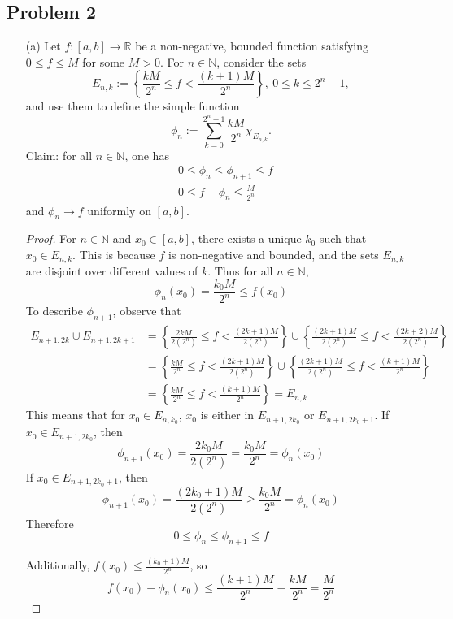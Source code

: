 \documentclass[12pt]{article}
\begin{document}
\subsection*{Problem 2}

\begin{itemize}
    \item[(a)] Let $f: [a,b] \to \mathbb{R}$ be a non-negative, bounded function satisfying $0 \leq f \leq M$ for some $M > 0$. For $n \in \mathbb{N}$, consider the sets $$E_{n,k} := \left\{ \frac{kM}{2^n} \leq f < \frac{(k+1)M}{2^n}\right\},~ 0 \leq k \leq 2^n -1,$$ and use them to define the simple function $$\phi_n := \sum_{k=0}^{2^n-1} \frac{kM}{2^n} \chi_{E_{n,k}}.$$ Claim: for all $n \in \mathbb{N}$, one has 
    \begin{align*}
        & 0 \leq \phi_n \leq \phi_{n+1} \leq f \\
        & 0 \leq f - \phi_n \leq \frac{M}{2^n}
    \end{align*}
    and $\phi_n \to f$ uniformly on $[a,b]$.

    \begin{proof}
        For $n \in \mathbb{N}$ and $x_0 \in [a,b]$, there exists a unique $k_0$ such that $x_0 \in E_{n,k}$. This is because $f$ is non-negative and bounded, and the sets $E_{n,k}$ are disjoint over different values of $k$. Thus for all $n \in \mathbb{N}$, $$\phi_n (x_0) = \frac{k_0M}{2^n} \leq f(x_0)$$ To describe $\phi_{n+1}$, observe that
        \begin{align*}
            E_{n+1, 2k} \cup E_{n+1, 2k+1} &= \left\{ \frac{2kM}{2 (2^n)} \leq f < \frac{(2k+1)M}{2(2^n)}\right\} \cup \left\{ \frac{(2k+1)M}{2(2^n)} \leq f < \frac{(2k+2)M}{2(2^n)}\right\} \\
            &= \left\{ \frac{kM}{2^n} \leq f < \frac{(2k+1)M}{2(2^n)}\right\} \cup \left\{ \frac{(2k+1)M}{2(2^n)} \leq f < \frac{(k+1)M}{2^n}\right\} \\
            &= \left\{ \frac{kM}{2^n} \leq f < \frac{(k+1)M}{2^n}\right\} = E_{n,k}
        \end{align*}
        This means that for $x_0 \in E_{n,k_0}$, $x_0$ is either in $E_{n+1, 2k_0}$ or $E_{n+1, 2k_0+1}$. If $x_0 \in E_{n+1, 2k_0}$, then $$\phi_{n+1}(x_0) = \frac{2k_0M}{2(2^n)} = \frac{k_0M}{2^n} = \phi_n(x_0)$$ If $x_0 \in E_{n+1, 2k_0+1}$, then $$\phi_{n+1}(x_0) = \frac{(2k_0+1)M}{2(2^n)} \geq \frac{k_0M}{2^n} = \phi_n(x_0)$$ Therefore $$0 \leq \phi_n \leq \phi_{n+1} \leq f$$

        Additionally, $f(x_0) \leq \frac{(k_0+1)M}{2^n}$, so $$f(x_0) - \phi_n(x_0) \leq \frac{(k+1)M}{2^n} - \frac{kM}{2^n} = \frac{M}{2^n}$$


\end{proof}
\end{itemize}
\end{document}
